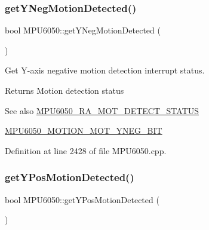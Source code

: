 \subsubsection{\texorpdfstring{getYNegMotionDetected()}{getYNegMotionDetected()}}
{\footnotesize\ttfamily bool M\+P\+U6050\+::get\+Y\+Neg\+Motion\+Detected (\begin{DoxyParamCaption}{ }\end{DoxyParamCaption})}

Get Y-\/axis negative motion detection interrupt status. \begin{DoxyReturn}{Returns}
Motion detection status 
\end{DoxyReturn}
\begin{DoxySeeAlso}{See also}
\mbox{\hyperlink{MPU6050_8h_a5b725ca4941b1a73f8e4df3d7164d514}{M\+P\+U6050\+\_\+\+R\+A\+\_\+\+M\+O\+T\+\_\+\+D\+E\+T\+E\+C\+T\+\_\+\+S\+T\+A\+T\+US}} 

\mbox{\hyperlink{MPU6050_8h_a5273d39ef8f5d87e931609fee90d4120}{M\+P\+U6050\+\_\+\+M\+O\+T\+I\+O\+N\+\_\+\+M\+O\+T\+\_\+\+Y\+N\+E\+G\+\_\+\+B\+IT}} 
\end{DoxySeeAlso}


Definition at line 2428 of file M\+P\+U6050.\+cpp.


\begin{DoxyCode}{0}

\end{DoxyCode}
\mbox{\label{classMPU6050_ad959ec84b9fe9f7e416b7af252f37abc}} 
\subsubsection{\texorpdfstring{getYPosMotionDetected()}{getYPosMotionDetected()}}
{\footnotesize\ttfamily bool M\+P\+U6050\+::get\+Y\+Pos\+Motion\+Detected (\begin{DoxyParamCaption}{ }\end{DoxyParamCaption})}

